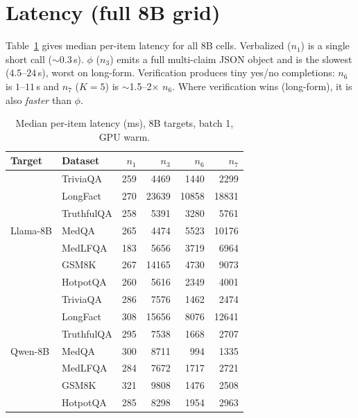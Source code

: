 \documentclass[11pt]{article}
\newcommand{\nverb}{$n_1$}     %
\newcommand{\nphi}{$n_3$}      %
\newcommand{\nyn}{$n_6$}       %
\newcommand{\nsc}{$n_7$}       %
\begin{document}
\section{Latency (full 8B grid)}\label{app:latency}
Table~\ref{tab:latfull} gives median per-item latency for all 8B cells. Verbalized ($n_1$) is a
single short call ($\sim$0.3\,s). $\phi$ ($n_3$) emits a full multi-claim JSON object and is the
slowest ($4.5$--$24$\,s), worst on long-form. Verification produces tiny yes/no completions:
$n_6$ is $1$--$11$\,s and $n_7$ ($K{=}5$) is $\sim$1.5--2$\times$ $n_6$. Where verification wins
(long-form), it is also \emph{faster} than $\phi$.
\begin{table}[t]
\centering\small
\setlength{\tabcolsep}{4pt}
\begin{tabular}{llrrrr}
\toprule
Target & Dataset & \nverb & \nphi & \nyn & \nsc \\
\midrule
\multirow{7}{*}{Llama-8B}
 & TriviaQA & 259 & 4469 & 1440 & 2299 \\
 & LongFact & 270 & 23639 & 10858 & 18831 \\
 & TruthfulQA & 258 & 5391 & 3280 & 5761 \\
 & MedQA & 265 & 4474 & 5523 & 10176 \\
 & MedLFQA & 183 & 5656 & 3719 & 6964 \\
 & GSM8K & 267 & 14165 & 4730 & 9073 \\
 & HotpotQA & 260 & 5616 & 2349 & 4001 \\
\midrule
\multirow{7}{*}{Qwen-8B}
 & TriviaQA & 286 & 7576 & 1462 & 2474 \\
 & LongFact & 308 & 15656 & 8076 & 12641 \\
 & TruthfulQA & 295 & 7538 & 1668 & 2707 \\
 & MedQA & 300 & 8711 & 994 & 1335 \\
 & MedLFQA & 284 & 7672 & 1717 & 2721 \\
 & GSM8K & 321 & 9808 & 1476 & 2508 \\
 & HotpotQA & 285 & 8298 & 1954 & 2963 \\
\bottomrule
\end{tabular}
\caption{Median per-item latency (ms), 8B targets, batch 1, GPU warm.}
\label{tab:latfull}
\end{table}
\end{document}
